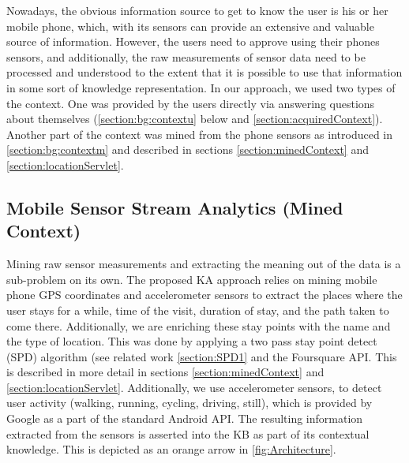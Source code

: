 Nowadays, the obvious information source to get to know the user is his or her
mobile phone, which, with its sensors can provide an extensive and valuable 
source of information. However, the users need to approve using their phones 
sensors, and additionally, the raw measurements of sensor data need to be 
processed and understood to the extent that it is possible to use that 
information in some sort of knowledge representation. In our approach, we used 
two types of the context. One was provided by the users directly via answering 
questions about themselves (\autoref{section:bg:contextu} below and 
\autoref{section:acquiredContext}). Another part 
of the context was mined from the phone sensors as introduced in 
\autoref{section:bg:contextm} and described in sections 
\ref{section:minedContext} and \ref{section:locationServlet}.

\subsection{Mobile Sensor Stream Analytics (Mined Context)} 
\label{section:bg:contectu}
Mining raw sensor measurements and extracting the meaning out of the data is a 
sub-problem on its own. The proposed KA approach relies on mining mobile phone 
GPS coordinates and accelerometer sensors to extract the places where the user 
stays for a while, time of the visit, duration of stay, and the path taken to 
come there. Additionally, we are enriching these stay points with the name and 
the type of location. This was done by applying a two pass stay point detect
(SPD) algorithm (see related work \autoref{section:SPD1} and the Foursquare API. 
This is described in more detail in sections \ref{section:minedContext} and
\ref{section:locationServlet}. Additionally, we use accelerometer sensors, 
to detect user activity (walking, running, cycling, driving, still), which is 
provided by Google as a part of the standard Android API. The resulting 
information extracted from the sensors is asserted into the KB as part of its 
contextual knowledge. This is depicted as an orange arrow in 
\autoref{fig:Architecture}.

